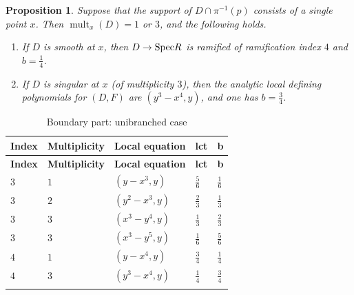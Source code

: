\documentclass[a4paper,12pt]{amsart}
\DeclareMathOperator{\mult}{mult}
\newcommand\spec{\text{\rm Spec}}
\newtheorem{prop}[theorem]{Proposition}
\theoremstyle{definition}
\theoremstyle{remark}
\begin{document}
\begin{prop}
  Suppose that the support of $D\cap \pi^{-1}(p)$ consists of a single point $x$. Then $\mult_x(D)=1$ or $3$, and the following holds.
    \begin{enumerate}
        \item If $D$ is smooth at $x$, then $D\to \spec R$ is ramified of ramification index $4$ and $b=\frac{1}{4}$.
        \item If $D$ is singular at $x$ (of multiplicity $3$), then the analytic local defining polynomials for $(D,F)$ are $(y^3-x^4,y)$, and one has $b=\frac{3}{4}$.
    \end{enumerate}
\end{prop}


\renewcommand{\arraystretch}{1.5}
\begin{longtable}{| p{} | p{} | p{} | p{} | p{} |}

\hline
\textbf{Index} & \textbf{Multiplicity} & \textbf{Local equation} & \textbf{lct} & \textbf{b} \\ \hline
\endfirsthead
\hline
\textbf{Index} & \textbf{Multiplicity} & \textbf{Local equation} & \textbf{lct} & \textbf{b} \\ \hline
\endhead
$3$ & $1$ & $(y-x^3,y)$ & $\tfrac{5}{6}$ & $\tfrac{1}{6}$ \\ \hline
$3$ & $2$ & $(y^2-x^3,y)$ & $\tfrac{2}{3}$ & $\tfrac{1}{3}$ \\ \hline
$3$ & $3$ & $(x^3-y^4,y)$ & $\tfrac{1}{3}$ & $\tfrac{2}{3}$ \\ \hline
$3$ & $3$ & $(x^3-y^5,y)$ & $\tfrac{1}{6}$ & $\tfrac{5}{6}$ \\ \hline
$4$ & $1$ & $(y-x^4,y)$ & $\tfrac{3}{4}$ & $\tfrac{1}{4}$ \\ \hline
$4$ & $3$ & $(y^3-x^4,y)$ & $\tfrac{1}{4}$ & $\tfrac{3}{4}$ \\ \hline
\caption{Boundary part: unibranched case} 
\end{longtable}
\end{document}

